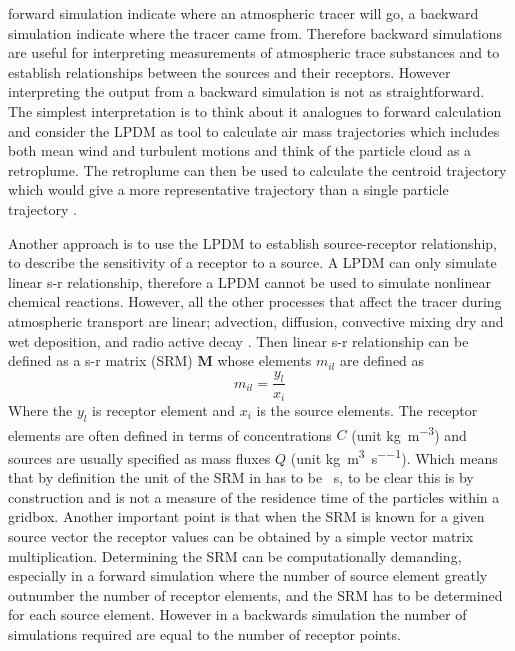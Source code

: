 forward simulation indicate where an atmospheric tracer will go, a backward simulation indicate where the 
tracer came from. Therefore backward simulations are useful for interpreting measurements of atmospheric 
trace substances and to establish relationships between the sources and their receptors.  However 
interpreting the output from a backward simulation is not as straightforward. The simplest interpretation is
to think about it analogues to forward calculation and consider the LPDM as tool to calculate air mass 
trajectories which includes both mean wind and turbulent motions and think of the particle cloud as a 
retroplume. The retroplume can then be used to calculate the centroid trajectory which would give a more 
representative trajectory than a single particle trajectory \parencite{stohl2002replacement}. \par Another 
approach is to use the LPDM to establish source-receptor relationship, to describe the sensitivity of a 
receptor to a source. A LPDM can only simulate linear s-r relationship, therefore a LPDM cannot be used to 
simulate nonlinear chemical reactions. However, all the other processes that affect the tracer during 
atmospheric transport are linear; advection, diffusion, convective mixing dry and wet deposition, and radio 
active decay \parencite{seibert2004source}. Then linear s-r relationship  can be defined as a s-r matrix 
(SRM) $\mathbf{M}$ whose elements $m_{il}$ are defined as
\begin{equation}\label{eq:s-r_relationship}
    m_{il} = \frac{y_l}{x_i}
\end{equation}
Where the $y_l$ is receptor element and $x_i$ is the source elements. The receptor elements are often 
defined in terms of concentrations $C$ (unit \si{\kg\per\cubic\metre}) and sources are usually specified as 
mass fluxes $Q$ (unit \si{\kg\per\cubic\metre\per\s}). 
Which means that by definition the unit of the SRM in  has to be \si{\per\s}, to be clear this is by construction and is not a measure of the residence time of the particles within a gridbox. Another important point is that when the SRM is known for a given source vector the receptor values can be obtained by a simple vector matrix multiplication. Determining the SRM can be computationally demanding, especially in a forward simulation where the number of source element greatly outnumber the number of receptor elements, and the SRM has to be determined for each source element. However in a backwards simulation the number of simulations required are equal to the number of receptor points. 
